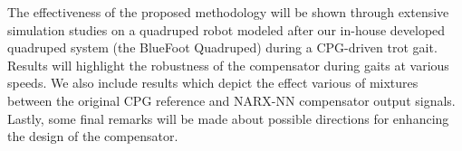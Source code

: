 The effectiveness of the proposed methodology will be shown through extensive simulation studies on a quadruped robot modeled after our in-house developed quadruped system (the BlueFoot Quadruped) during a CPG-driven trot gait. Results will highlight the robustness of the compensator during gaits at various speeds. We also include results which depict the effect various of mixtures between the original CPG reference and NARX-NN compensator output signals. Lastly, some final remarks will be made about possible directions for enhancing the design of the compensator.